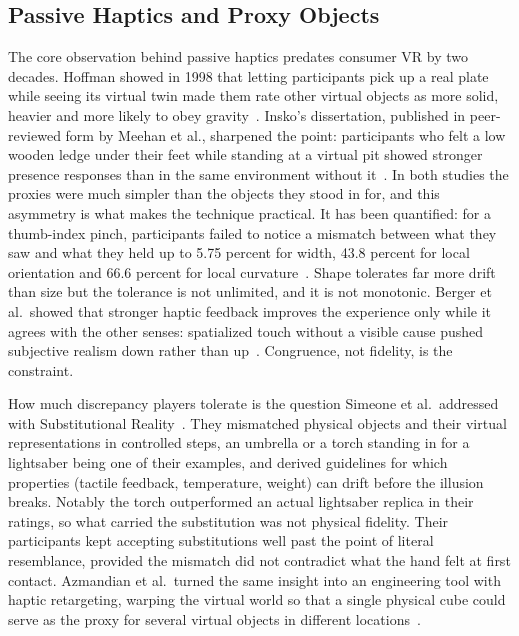 
\subsection{Passive Haptics and Proxy Objects}
\label{sec:rw-passive-haptics}

The core observation behind passive haptics predates consumer VR by two decades. Hoffman showed in 1998 that letting participants pick up a real plate while seeing its virtual twin made them rate other virtual objects as more solid, heavier and more likely to obey gravity~\cite{Hoffman.1998}. Insko's dissertation, published in peer-reviewed form by Meehan et al., sharpened the point: participants who felt a low wooden ledge under their feet while standing at a virtual pit showed stronger presence responses than in the same environment without it~\cite{Insko.2001,Meehan.2002}. In both studies the proxies were much simpler than the objects they stood in for, and this asymmetry is what makes the technique practical. It has been quantified: for a thumb-index pinch, participants failed to notice a mismatch between what they saw and what they held up to 5.75 percent for width, 43.8 percent for local orientation and 66.6 percent for local curvature~\cite{deTinguy.2019}. Shape tolerates far more drift than size but the tolerance is not unlimited, and it is not monotonic. Berger et al.\ showed that stronger haptic feedback improves the experience only while it agrees with the other senses: spatialized touch without a visible cause pushed subjective realism down rather than up~\cite{Berger.2018}. Congruence, not fidelity, is the constraint.

How much discrepancy players tolerate is the question Simeone et al.\ addressed with Substitutional Reality~\cite{substitutional-reality}. They mismatched physical objects and their virtual representations in controlled steps, an umbrella or a torch standing in for a lightsaber being one of their examples, and derived guidelines for which properties (tactile feedback, temperature, weight) can drift before the illusion breaks. Notably the torch outperformed an actual lightsaber replica in their ratings, so what carried the substitution was not physical fidelity. Their participants kept accepting substitutions well past the point of literal resemblance, provided the mismatch did not contradict what the hand felt at first contact. Azmandian et al.\ turned the same insight into an engineering tool with haptic retargeting, warping the virtual world so that a single physical cube could serve as the proxy for several virtual objects in different locations~\cite{Azmandian.2016}.

